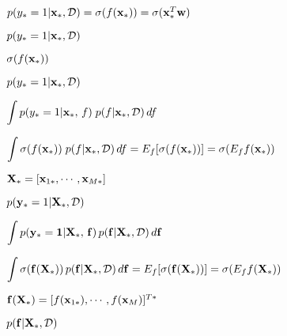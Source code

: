 \documentclass{article}
\def\lthtmlcheckvsize{\ifdim\ht\sizebox<\vsize 
  \ifdim\wd\sizebox<\hsize\expandafter\hfill\fi \expandafter\vfill
  \else\expandafter\vss\fi}%
\begin{document}
{\newpage\clearpage
{}%
$ p(y_*=1|{\bf x}_*,{\cal D})=\sigma(f({\bf x}_*))=\sigma({\bf x}^T_*{\bf w})$%
\lthtmlindisplaymathZ
\lthtmlcheckvsize\clearpage}

{\newpage\clearpage
{}%
$ p(y_*=1|{\bf x}_*,{\cal D})$%
\lthtmlindisplaymathZ
\lthtmlcheckvsize\clearpage}

{\newpage\clearpage
{}%
$ \sigma(f({\bf x}_*))$%
\lthtmlindisplaymathZ
\lthtmlcheckvsize\clearpage}

{\newpage\clearpage
{}%
$\displaystyle p(y_*=1|{\bf x}_*,{\cal D})$%
\lthtmlindisplaymathZ
\lthtmlcheckvsize\clearpage}

{\newpage\clearpage
{}%
$\displaystyle \int p(y_*=1|{\bf x}_*,\,f)\;p(f|{{\bf x}_*,\cal D})\,d f$%
\lthtmlindisplaymathZ
\lthtmlcheckvsize\clearpage}

{\newpage\clearpage
{}%
$\displaystyle \int\sigma(f({\bf x}_*))\;p(f|{\bf x}_*,{\cal D})\,d f
=E_f[\sigma(f({\bf x}_*))]=\sigma(E_f f({\bf x}_*))$%
\lthtmlindisplaymathZ
\lthtmlcheckvsize\clearpage}

{\newpage\clearpage
{}%
$ {\bf X}_*=[{\bf x}_{1*},\cdots,{\bf x}_{M*}]$%
\lthtmlindisplaymathZ
\lthtmlcheckvsize\clearpage}

{\newpage\clearpage
{}%
$\displaystyle p({\bf y}_*=1|{\bf X}_*,{\cal D})$%
\lthtmlindisplaymathZ
\lthtmlcheckvsize\clearpage}

{\newpage\clearpage
{}%
$\displaystyle \int p({\bf y}_*={\bf 1}|{\bf X}_*,\,{\bf f})\,
p({\bf f}|{\bf X}_*,{\cal D})\,d {\bf f}$%
\lthtmlindisplaymathZ
\lthtmlcheckvsize\clearpage}

{\newpage\clearpage
{}%
$\displaystyle \int\sigma({\bf f}({\bf X}_*))\, p({\bf f}|{\bf X}_*,{\cal D})\,d {\bf f}
=E_f[\sigma({\bf f}({\bf X}_*))]
=\sigma(E_f f({\bf X}_*))$%
\lthtmlindisplaymathZ
\lthtmlcheckvsize\clearpage}

{\newpage\clearpage
{}%
$ {\bf f}({\bf X}_*)=[f({\bf x}_{1*}),\cdots,f({\bf x}_M)]^{T*}$%
\lthtmlindisplaymathZ
\lthtmlcheckvsize\clearpage}

{\newpage\clearpage
{}%
$ p({\bf f}|{\bf X}_*,{\cal D})$%
\lthtmlindisplaymathZ
\lthtmlcheckvsize\clearpage}
\end{document}

